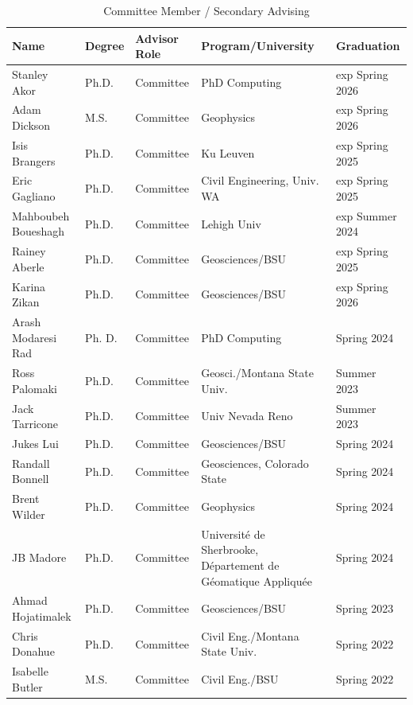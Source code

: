 \documentclass[11pt]{article}
\renewcommand\arraystretch{1}
\begin{document}
\begin{table}[!htbp]
\caption*{Committee Member / Secondary Advising}
\tiny
\renewcommand\arraystretch{0.7}
  \centering
  \begin{tabular}{|l|l|l|l|l|}
\hline
\textbf{Name} & \textbf{Degree} & \textbf{Advisor Role} & \textbf{Program/University} & \textbf{Graduation} \\ \hline \hline
Stanley Akor & Ph.D. & Committee & PhD Computing & exp Spring 2026 \\ \hline
Adam Dickson & M.S. & Committee & Geophysics & exp Spring 2026 \\ \hline
Isis Brangers & Ph.D. & Committee & Ku Leuven & exp Spring 2025 \\ \hline
Eric Gagliano & Ph.D. & Committee & Civil Engineering, Univ. WA & exp Spring 2025 \\ \hline
Mahboubeh Boueshagh & Ph.D. & Committee & Lehigh Univ & exp Summer 2024 \\ \hline
Rainey Aberle & Ph.D. & Committee & Geosciences/BSU & exp Spring 2025 \\ \hline
Karina Zikan & Ph.D. & Committee & Geosciences/BSU & exp Spring 2026 \\ \hline
Arash Modaresi Rad & Ph. D. & Committee & PhD Computing & Spring 2024 \\ \hline
Ross Palomaki & Ph.D. & Committee & Geosci./Montana State Univ. & Summer 2023 \\ \hline
Jack Tarricone & Ph.D. & Committee & Univ Nevada Reno & Summer 2023 \\ \hline
Jukes Lui & Ph.D. & Committee & Geosciences/BSU & Spring 2024 \\ \hline
Randall Bonnell & Ph.D. & Committee & Geosciences, Colorado State & Spring 2024 \\ \hline
Brent Wilder & Ph.D. & Committee & Geophysics & Spring 2024 \\ \hline
JB Madore & Ph.D. & Committee & Université de Sherbrooke, Département de Géomatique Appliquée & Spring 2024 \\ \hline
Ahmad Hojatimalek & Ph.D. & Committee & Geosciences/BSU & Spring 2023 \\ \hline
Chris Donahue & Ph.D. & Committee & Civil Eng./Montana State Univ. & Spring 2022 \\ \hline
Isabelle Butler & M.S. & Committee & Civil Eng./BSU & Spring 2022 \\ \hline

\end{tabular}
\end{table}
\end{document}
